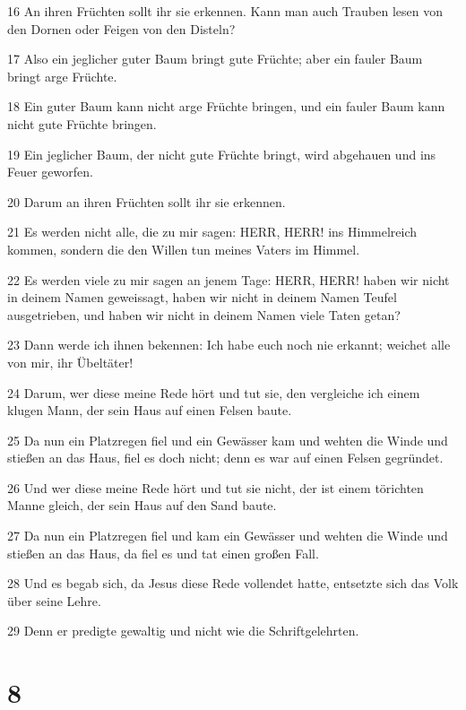 \par 16 An ihren Früchten sollt ihr sie erkennen. Kann man auch Trauben lesen von den Dornen oder Feigen von den Disteln?
\par 17 Also ein jeglicher guter Baum bringt gute Früchte; aber ein fauler Baum bringt arge Früchte.
\par 18 Ein guter Baum kann nicht arge Früchte bringen, und ein fauler Baum kann nicht gute Früchte bringen.
\par 19 Ein jeglicher Baum, der nicht gute Früchte bringt, wird abgehauen und ins Feuer geworfen.
\par 20 Darum an ihren Früchten sollt ihr sie erkennen.
\par 21 Es werden nicht alle, die zu mir sagen: HERR, HERR! ins Himmelreich kommen, sondern die den Willen tun meines Vaters im Himmel.
\par 22 Es werden viele zu mir sagen an jenem Tage: HERR, HERR! haben wir nicht in deinem Namen geweissagt, haben wir nicht in deinem Namen Teufel ausgetrieben, und haben wir nicht in deinem Namen viele Taten getan?
\par 23 Dann werde ich ihnen bekennen: Ich habe euch noch nie erkannt; weichet alle von mir, ihr Übeltäter!
\par 24 Darum, wer diese meine Rede hört und tut sie, den vergleiche ich einem klugen Mann, der sein Haus auf einen Felsen baute.
\par 25 Da nun ein Platzregen fiel und ein Gewässer kam und wehten die Winde und stießen an das Haus, fiel es doch nicht; denn es war auf einen Felsen gegründet.
\par 26 Und wer diese meine Rede hört und tut sie nicht, der ist einem törichten Manne gleich, der sein Haus auf den Sand baute.
\par 27 Da nun ein Platzregen fiel und kam ein Gewässer und wehten die Winde und stießen an das Haus, da fiel es und tat einen großen Fall.
\par 28 Und es begab sich, da Jesus diese Rede vollendet hatte, entsetzte sich das Volk über seine Lehre.
\par 29 Denn er predigte gewaltig und nicht wie die Schriftgelehrten.

\chapter{8}

